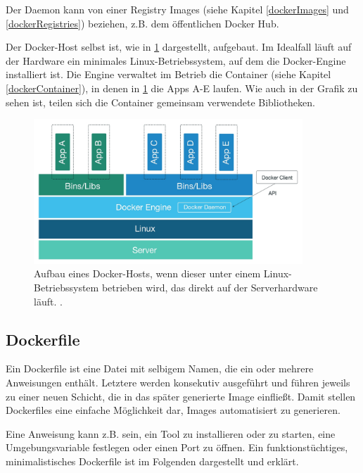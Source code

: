 \documentclass[../main.tex]{subfiles}
\begin{document}
      Der Daemon kann von einer Registry Images (siehe Kapitel \ref{dockerImages} und \ref{dockerRegistries}) beziehen, z.B. dem öffentlichen Docker Hub.

      Der Docker-Host selbst ist, wie in \fig \ref{fig:intro_dockerHost} dargestellt, aufgebaut. Im Idealfall läuft auf der Hardware ein minimales Linux-Betriebssystem, auf dem die Docker-Engine installiert ist. Die Engine verwaltet im Betrieb die Container (siehe Kapitel \ref{dockerContainer}), in denen in \fig \ref{fig:intro_dockerHost} die Apps A-E laufen. Wie auch in der Grafik zu sehen ist, teilen sich die Container gemeinsam verwendete Bibliotheken.%

      \begin{figure}[h]
          \centering
          \includegraphics[width=0.9\textwidth]{./images/intro_dockerHost.jpg}
          \caption{Aufbau eines Docker-Hosts, wenn dieser unter einem Linux-Betriebssystem betrieben wird, das direkt auf der Serverhardware läuft. \cite[S.3]{dockerSecIntro}.}
          \label{fig:intro_dockerHost}
      \end{figure}

		\subsection{Dockerfile}
		\label{dockerDockerfile}
      Ein Dockerfile ist eine Datei mit selbigem Namen, die ein oder mehrere Anweisungen enthält. Letztere werden konsekutiv ausgeführt und führen jeweils zu einer neuen Schicht, die in das später generierte Image einfließt. Damit stellen Dockerfiles eine einfache Möglichkeit dar, Images automatisiert zu generieren.

      Eine Anweisung kann z.B. sein, ein Tool zu installieren oder zu starten, eine Umgebungsvariable festlegen oder einen Port zu öffnen. Ein funktionstüchtiges, minimalistisches Dockerfile ist im Folgenden dargestellt und erklärt.
\end{document}
